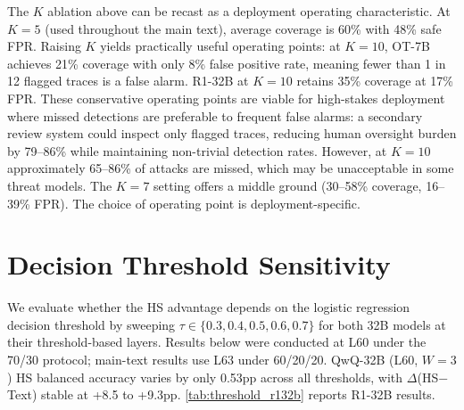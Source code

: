 The $K$ ablation above can be recast as a deployment operating characteristic. At $K{=}5$ (used throughout the main text), average coverage is 60\% with 48\% safe FPR. Raising $K$ yields practically useful operating points: at $K{=}10$, OT-7B achieves 21\% coverage with only 8\% false positive rate, meaning fewer than 1 in 12 flagged traces is a false alarm. R1-32B at $K{=}10$ retains 35\% coverage at 17\% FPR. These conservative operating points are viable for high-stakes deployment where missed detections are preferable to frequent false alarms: a secondary review system could inspect only flagged traces, reducing human oversight burden by 79--86\% while maintaining non-trivial detection rates. However, at $K{=}10$ approximately 65--86\% of attacks are missed, which may be unacceptable in some threat models. The $K{=}7$ setting offers a middle ground (30--58\% coverage, 16--39\% FPR). The choice of operating point is deployment-specific.


\section{Decision Threshold Sensitivity}
\label{app:threshold_sensitivity}

We evaluate whether the HS advantage depends on the logistic regression decision threshold by sweeping $\tau \in \{0.3, 0.4, 0.5, 0.6, 0.7\}$ for both 32B models at their threshold-based layers. Results below were conducted at L60 under the 70/30 protocol; main-text results use L63 under 60/20/20. QwQ-32B (L60, $W{=}3$) HS balanced accuracy varies by only 0.53pp across all thresholds, with $\Delta$(HS$-$Text) stable at +8.5 to +9.3pp. \cref{tab:threshold_r132b} reports R1-32B results.

\begin{table}[htbp]
\centering
\small
\caption{R1-32B threshold sensitivity (L63, $W{=}1$). HS BA varies by 1.1pp (0.741--0.752); the HS advantage is consistent across all thresholds.}
\label{tab:threshold_r132b}
\end{table}

